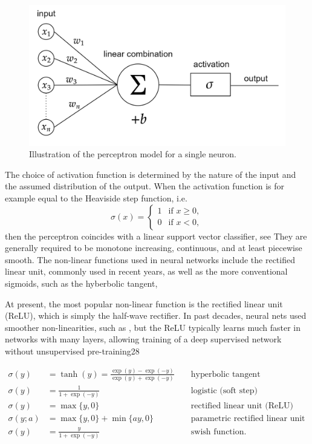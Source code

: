 \begin{figure}[H]
    \begin{center}
        \includegraphics[scale=0.3]{img/diagram-20220205_1.png}
    \end{center}
    \caption{Illustration of the perceptron model for a single neuron.}
    \label{fig4}
\end{figure}

The choice of activation function is determined by the nature of the input and the assumed distribution of the output. When the activation function is for example equal to the Heaviside step function, i.e.
\begin{equation*}
    \sigma(x) = \begin{cases} 1 & \text{if } x \geq 0, \\ 0 & \text{if } x < 0, \end{cases}
\end{equation*}
then the perceptron coincides with a linear support vector classifier, see 
They are generally required to be monotone
increasing, continuous, and at least piecewise smooth. 
The non-linear functions used in neural networks include the rectified linear unit, commonly used in recent years, as well as the more conventional sigmoids, such as the hyberbolic tangent, 

At present, the most popular non-linear function is the rectified linear unit (ReLU), which is simply the half-wave rectifier. In past decades, neural nets used smoother non-linearities, such as , but the ReLU typically learns much faster in networks with many layers, allowing training of a deep supervised network without unsupervised pre-training28

\begin{align}
    \sigma(y) &=\tanh (y)=\frac{\exp (y)-\exp (-y)}{\exp (y)+\exp (-y)} & & \text { hyperbolic tangent } \\
    \sigma(y) &=\frac{1}{1+\exp (-y)} & & \text { logistic (soft step) } \\
    \sigma(y) &=\max \{y, 0\} & & \text { rectified linear unit (ReLU) } \\
    \sigma(y ; a) &=\max \{y, 0\}+\min \{a y, 0\} & & \text { parametric rectified linear unit (PReLU) } \\
    \sigma(y) &=\frac{y}{1+\exp (-y)} & & \text { swish function. }
\end{align}


